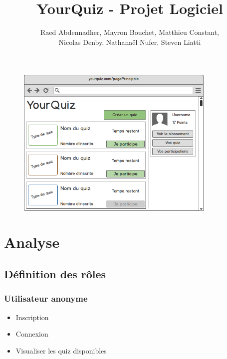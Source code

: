 \documentclass[a4paper, 12pt]{article}
\begin{document}
\title{YourQuiz - Projet Logiciel}
\author{Raed Abdennadher, Mayron Bouchet, Matthieu Constant, \\ Nicolas Denby, Nathanaël Nufer, Steven Liatti}
\maketitle

\begin{figure}
	\begin{center}
		\includegraphics[width=0.85\textwidth]{mockups/png/mainPage.png}
	\end{center}
\end{figure}
\newpage

\tableofcontents
\listoffigures

\newpage

\section{Analyse}
\subsection{Définition des rôles}
\subsubsection{Utilisateur anonyme}
\begin{itemize}
    \item Inscription
    \item Connexion
    \item Visualiser les quiz disponibles
\end{itemize}
\end{document}

